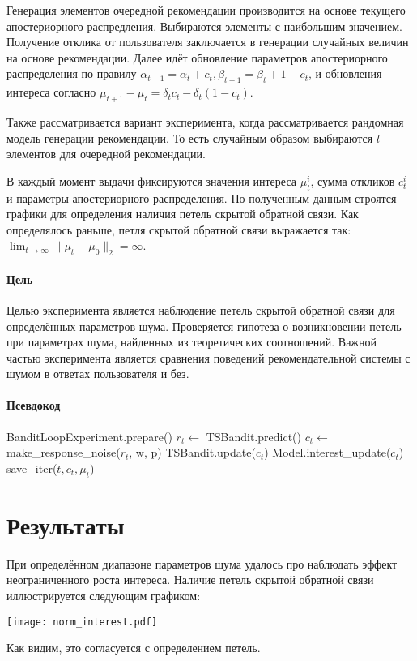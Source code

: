 \documentclass[12pt, twoside]{article}
\begin{document}
Генерация элементов очередной рекомендации производится на основе текущего апостериорного распредления. 
Выбираются элементы с наибольшим значением. 
Получение отклика от пользователя заключается в генерации случайных величин на основе рекомендации.
Далее идёт обновление параметров апостериорного распределения по правилу $\alpha_{t+1} = \alpha_t + c_t, \beta_{t+1} = \beta_t + 1 - c_t$, и обновления интереса согласно 
$\mu_{t+1} - \mu_{t} = \delta_t c_t - \delta_t (1 - c_t)$.

Также рассматривается вариант эксперимента, когда рассматривается рандомная модель генерации рекомендации. То есть случайным образом выбираются $l$ элементов для очередной рекомендации. 

В каждый момент выдачи фиксируются значения интереса $\mu_t^i$, сумма откликов $c_t^i$ и параметры апостериорного распределения. 
По полученным данным строятся графики для определения наличия петель скрытой обратной связи.
Как определялось раньше, петля скрытой обратной связи выражается так: $\lim_{t \to \infty} \|\mu_t - \mu_0 \|_2 = \infty$.

\paragraph{Цель}
Целью эксперимента является наблюдение петель скрытой обратной связи для определённых параметров шума. 
Проверяется гипотеза о возникновении петель при параметрах шума, найденных из теоретических соотношений. 
Важной частью эксперимента является сравнения поведений рекомендательной системы с шумом в ответах пользователя и без. 

\paragraph{Псевдокод}
\begin{algorithmic}
  \STATE BanditLoopExperiment.prepare()
    \STATE $r_t \leftarrow$ TSBandit.predict()
    \STATE $c_t \leftarrow$ make\_response\_noise($r_t$, w, p)
    \STATE TSBandit.update($c_t$)
    \STATE Model.interest\_update($c_t$)
    \STATE save\_iter($t, c_t, \mu_t$)
  \ENDFOR
\end{algorithmic}
\section{Результаты}
При определённом диапазоне параметров шума удалось про наблюдать эффект неограниченного роста интереса. 
Наличие петель скрытой обратной связи иллюстрируется следующим графиком: 
\begin{center}
  \texttt{[image: norm\_interest.pdf]}
\end{center}
Как видим, это согласуется с определением петель. 
\end{document}
